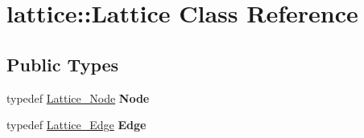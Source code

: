 \hypertarget{classlattice_1_1Lattice}{
\section{lattice::Lattice Class Reference}
\label{classlattice_1_1Lattice}
}
\subsection*{Public Types}
\begin{DoxyCompactItemize}
\item 
\hypertarget{classlattice_1_1Lattice_a74f989d4c34d5ad1717a194194eaed71}{
typedef \hyperlink{classlattice_1_1Lattice__Node}{Lattice\_\-Node} {\bfseries Node}}
\label{classlattice_1_1Lattice_a74f989d4c34d5ad1717a194194eaed71}

\item 
\hypertarget{classlattice_1_1Lattice_a9f4acdebf1d889ee76d432dc549ee9b8}{
typedef \hyperlink{classlattice_1_1Lattice__Edge}{Lattice\_\-Edge} {\bfseries Edge}}
\label{classlattice_1_1Lattice_a9f4acdebf1d889ee76d432dc549ee9b8}

\end{DoxyCompactItemize}
